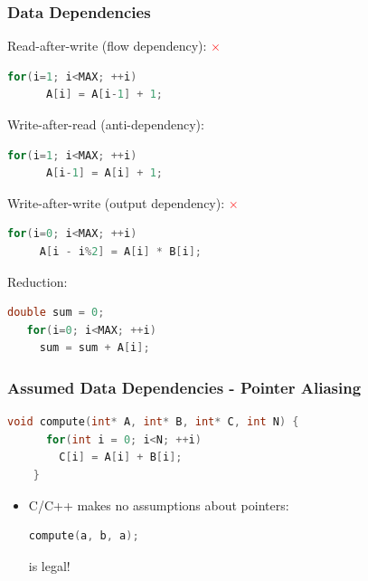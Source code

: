 \documentclass{beamer}
\begin{document}
\begin{frame}[fragile]
  \frametitle{Data Dependencies}
  Read-after-write (flow dependency): \textcolor{red}{$\times$}
  \begin{lstlisting}[language=C++]
    for(i=1; i<MAX; ++i) 
      A[i] = A[i-1] + 1;
  \end{lstlisting}
  Write-after-read (anti-dependency): \textcolor{green}{\checkmark}
  \begin{lstlisting}[language=C++]
    for(i=1; i<MAX; ++i) 
      A[i-1] = A[i] + 1;
  \end{lstlisting}
  Write-after-write (output dependency): \textcolor{red}{$\times$}
  \begin{lstlisting}[language=C++]
   for(i=0; i<MAX; ++i)
     A[i - i%2] = A[i] * B[i]; 
  \end{lstlisting}
  Reduction: \textcolor{green}{\checkmark}
  \begin{lstlisting}[language=C++]
   double sum = 0;
   for(i=0; i<MAX; ++i)
     sum = sum + A[i];
  \end{lstlisting}
\end{frame}

\begin{frame}[fragile]
  \frametitle{Assumed Data Dependencies - Pointer Aliasing}
  \begin{lstlisting}[language=C++]
    void compute(int* A, int* B, int* C, int N) {
      for(int i = 0; i<N; ++i) 
        C[i] = A[i] + B[i];
    }
  \end{lstlisting}
  
  \begin{itemize}
   \item C/C++ makes no assumptions about pointers:
   \begin{lstlisting}[language=C++]
      compute(a, b, a);
  \end{lstlisting}
  is legal!
  \end{itemize}

  
  
  \begin{lstlisting}[language=C++]

  \end{lstlisting}
\end{frame}
\end{document}
